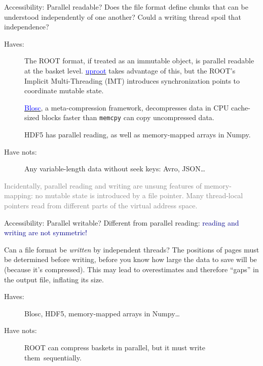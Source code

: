 \documentclass[aspectratio=169]{beamer}
\begin{document}
\begin{frame}{Accessibility: Parallel readable?}
\vspace{0.5 cm}
Does the file format define chunks that can be understood independently of one another? Could a writing thread spoil that independence?

\vfill

\begin{description}
\item[Haves:] The ROOT format, if treated as an immutable object, is parallel readable at the basket level. \href{https://github.com/scikit-hep/uproot}{\textcolor{blue}{uproot}} takes advantage of this, but the ROOT's Implicit Multi-Threading (IMT) introduces synchronization points to coordinate mutable state.

\vspace{0.1 cm}
\href{http://blosc.org/pages/blosc-in-depth/}{\textcolor{blue}{Blosc}}, a meta-compression framework, decompresses data in CPU cache-sized blocks faster than {\tt\small memcpy} can copy uncompressed data.

\vspace{0.1 cm}
HDF5 has parallel reading, as well as memory-mapped arrays in Numpy.

\item[Have nots:] Any variable-length data without seek keys: Avro, JSON\ldots
\end{description}

\vfill

\textcolor{gray}{Incidentally, parallel reading and writing are unsung features of memory-mapping: no mutable state is introduced by a file pointer. Many thread-local pointers read from different parts of the virtual address space.}
\end{frame}

\begin{frame}{Accessibility: Parallel writable?}
\vspace{0.5 cm}
Different from parallel reading: \textcolor{darkblue}{reading and writing are not symmetric!}

\vspace{0.5 cm}
Can a file format be {\it written} by independent threads? The positions of pages must be determined before writing, before you know how large the data to save will be (because it's compressed). This may lead to overestimates and therefore ``gaps'' in the output file, inflating its size.

\vspace{0.5 cm}

\begin{description}
\item[Haves:] Blosc, HDF5, memory-mapped arrays in Numpy\ldots
\item[Have nots:] ROOT can compress baskets in parallel, but it must write \mbox{them sequentially.\hspace{-1 cm}}
\end{description}
\end{frame}
\end{document}
